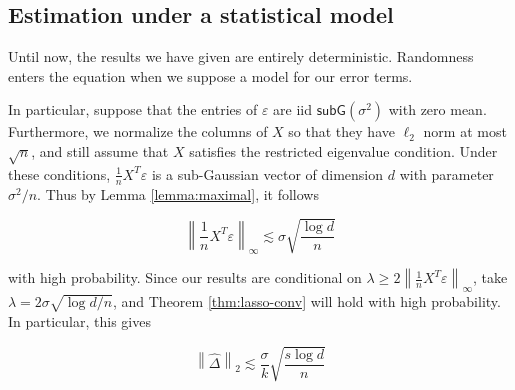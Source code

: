 \documentclass{article}
\newcommand{\subG}{\mathsf{subG}}
\newcommand{\norm}[1]{\left\|#1\right\|}
\newcommand{\eps}{\varepsilon} %
\begin{document}
\subsection{Estimation under a statistical model}

Until now, the results we have given are entirely deterministic. Randomness
enters the equation when we suppose a model for our error terms. 

In particular,
suppose that the entries of $\eps$ are iid $\subG(\sigma^2)$ with zero mean.
Furthermore, we normalize the columns of $X$ so that they have $\ell_2$ norm at
most $\sqrt{n}$, and still assume that $X$ satisfies the restricted eigenvalue
condition. Under these conditions, $\frac1nX^T\eps$ is a sub-Gaussian vector
of dimension $d$ with parameter $\sigma^2/n$. Thus by Lemma \ref{lemma:maximal},
it follows 

$$\norm{\frac1nX^T\eps}_{\infty} \lesssim \sigma\sqrt{\frac{\log d}{n}}$$

with high probability. Since our results are conditional on $\lambda \geq
2\norm{\frac1nX^T\eps}_{\infty}$, take $\lambda = 2\sigma\sqrt{\log d / n}$, and
Theorem \ref{thm:lasso-conv} will hold with high probability. In particular,
this gives 

$$\norm{\hat{\Delta}}_2 \lesssim \frac{\sigma}{k}\sqrt{\frac{s\log d}{n}}$$
\end{document}
